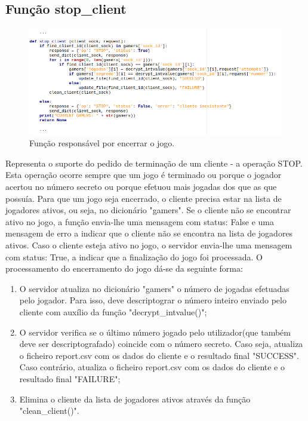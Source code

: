 \documentclass{report}
\begin{document}
\subsection{Função \textbf{stop\_client}}
\begin{figure}[H]
	\centering
	\includegraphics[scale=0.65]{stop_client}	
	\caption{Função responsável por encerrar o jogo.}
\end{figure}

Representa o suporte do pedido de terminação de um cliente - a operação STOP.
Esta operação ocorre sempre que um jogo é terminado ou porque o jogador acertou no número secreto ou porque efetuou mais jogadas dos que as que possuía.
Para que um jogo seja encerrado, o cliente precisa estar na lista de jogadores ativos, ou seja, no dicionário "gamers".
Se o cliente não se encontrar ativo no jogo, a função envia-lhe uma mensagem com status: False e uma mensagem de erro a indicar que o cliente não se encontra na lista de jogadores ativos.
Caso o cliente esteja ativo no jogo, o servidor envia-lhe uma mensagem com status: True, a indicar que a finalização do jogo foi processada.
O processamento do encerramento do jogo dá-se da seguinte forma: 
\begin{enumerate}
\item O servidor atualiza no dicionário "gamers" o número de jogadas efetuadas pelo jogador. Para isso, deve descriptograr o número inteiro enviado pelo cliente com auxílio da função "decrypt\_intvalue()";
\item O servidor verifica se o último número jogado pelo utilizador(que também deve ser descriptografado) coincide com o número secreto.
Caso seja, atualiza o ficheiro report.csv com os dados do cliente e o resultado final "SUCCESS". Caso contrário, atualiza o ficheiro report.csv com os dados do cliente e o resultado final "FAILURE";
\item Elimina o cliente da lista de jogadores ativos através da função "clean\_client()".
\end{enumerate}
\end{document}
